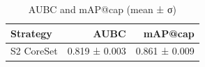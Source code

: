 \begin{table}[t]
\centering
\caption{AUBC and mAP@cap (mean ± σ)}
\label{tbl:aubc}
\begin{tabular}{lrr}
\toprule
Strategy & AUBC & mAP@cap \\
\midrule
S2 CoreSet & 0.819 ± 0.003 & 0.861 ± 0.009 \\
\bottomrule
\end{tabular}
\end{table}
